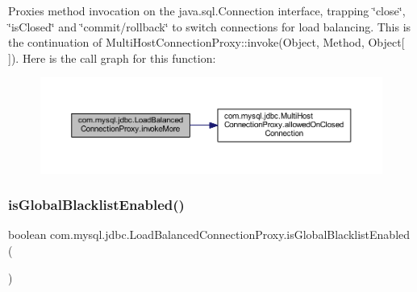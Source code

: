 Proxies method invocation on the java.\+sql.\+Connection interface, trapping \char`\"{}close\char`\"{}, \char`\"{}is\+Closed\char`\"{} and \char`\"{}commit/rollback\char`\"{} to switch connections for load balancing. This is the continuation of Multi\+Host\+Connection\+Proxy\+::invoke(\+Object, Method, Object\mbox{[}$\,$\mbox{]}). Here is the call graph for this function\+:
\nopagebreak
\begin{figure}[H]
\begin{center}
\leavevmode
\includegraphics[width=350pt]{classcom_1_1mysql_1_1jdbc_1_1_load_balanced_connection_proxy_ae2cd16fd57c22bbaf99664f34f67d8fc_cgraph}
\end{center}
\end{figure}
\mbox{\label{classcom_1_1mysql_1_1jdbc_1_1_load_balanced_connection_proxy_ad91c83a171c79295fa29cfdca16cc89f}} 
\subsubsection{\texorpdfstring{is\+Global\+Blacklist\+Enabled()}{isGlobalBlacklistEnabled()}}
{\footnotesize\ttfamily boolean com.\+mysql.\+jdbc.\+Load\+Balanced\+Connection\+Proxy.\+is\+Global\+Blacklist\+Enabled (\begin{DoxyParamCaption}{ }\end{DoxyParamCaption})}

